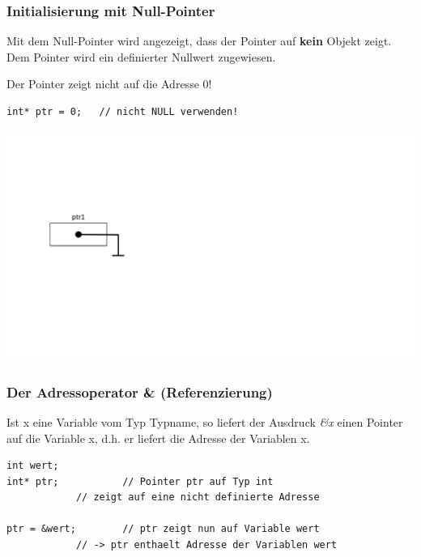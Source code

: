 \subsubsection{Initialisierung mit Null-Pointer}
Mit dem Null-Pointer wird angezeigt, dass der Pointer auf \textbf{kein} Objekt zeigt. Dem Pointer wird ein definierter Nullwert zugewiesen.\\
\begin{hinweis}
Der Pointer zeigt nicht auf die Adresse 0!
\end{hinweis}
\noindent
\begin{minipage}{0.5\linewidth}
\begin{lstlisting}
int* ptr = 0;	// nicht NULL verwenden!
\end{lstlisting}
\end{minipage}
\hspace{0.01\linewidth}
\begin{minipage}{0.2\linewidth}
	\includegraphics[width=\linewidth]{images/pointer3.pdf}
\end{minipage}

\subsubsection{Der Adressoperator \& \textbf{(Referenzierung)}}
Ist x eine Variable vom Typ Typname, so liefert der Ausdruck \emph{\&x} einen Pointer auf die Variable x, d.h. er liefert die Adresse der Variablen x.\\
\noindent
\begin{minipage}{0.65\linewidth}
\begin{lstlisting}
int wert;
int* ptr;			// Pointer ptr auf Typ int
			// zeigt auf eine nicht definierte Adresse
		
ptr = &wert;		// ptr zeigt nun auf Variable wert 
			// -> ptr enthaelt Adresse der Variablen wert
\end{lstlisting}
\end{minipage}

